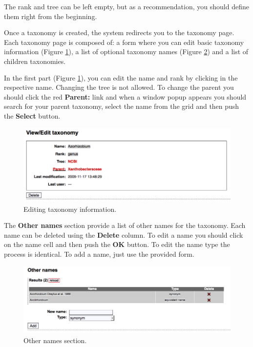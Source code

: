 The rank and tree can be left empty, but as a recommendation, you should define them right
from the beginning.

Once a taxonomy is created, the system redirects you to the taxonomy page.
Each taxonomy page is composed of: a form where you can edit basic taxonomy information (Figure \ref{fig:taxonomy_basic}),
a list of optional taxonomy names (Figure \ref{fig:other_names}) and a list of children taxonomies.

In the first part (Figure \ref{fig:taxonomy_basic}), you can edit the name and rank by clicking in the respective name.
Changing the tree is not allowed. To change the parent you should click the red \textbf{Parent:} link and when
a window popup appears you should search for your parent taxonomy, select the name from the grid and then push
the \textbf{Select} button.

\begin{figure}[H]
  \centering
    \includegraphics[scale=0.4]{taxonomy_basic.png}
  \caption{Editing taxonomy information.}
  \label{fig:taxonomy_basic}
\end{figure}

The \textbf{Other names} section provide a list of other names for the taxonomy. Each name can be deleted
using the \textbf{Delete} column. To edit a name you should click on the name cell and then push the \textbf{OK}
button. To edit the name type the process is identical. To add a name, just use the provided form.

\begin{figure}[H]
  \centering
    \includegraphics[scale=0.4]{other_names.png}
  \caption{Other names section.}
  \label{fig:other_names}
\end{figure}

